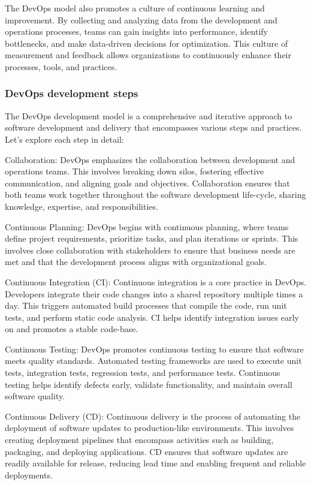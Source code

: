 \documentclass[
12pt,
oneside, 
onehalfspacing, 
nolistspacing, 
parskip, 
chapterinoneline, 
]{AASTCOMPUTER}
\begin{document}
The DevOps model also promotes a culture of continuous learning and improvement. By collecting and analyzing data from the development and operations processes, teams can gain insights into performance, identify bottlenecks, and make data-driven decisions for optimization. This culture of measurement and feedback allows organizations to continuously enhance their processes, tools, and practices.

\subsubsection{DevOps development steps}

The DevOps development model is a comprehensive and iterative approach to software development and delivery that encompasses various steps and practices. Let's explore each step in detail:

Collaboration: DevOps emphasizes the collaboration between development and operations teams. This involves breaking down silos, fostering effective communication, and aligning goals and objectives. Collaboration ensures that both teams work together throughout the software development life-cycle, sharing knowledge, expertise, and responsibilities.

Continuous Planning: DevOps begins with continuous planning, where teams define project requirements, prioritize tasks, and plan iterations or sprints. This involves close collaboration with stakeholders to ensure that business needs are met and that the development process aligns with organizational goals.

Continuous Integration (CI): Continuous integration is a core practice in DevOps. Developers integrate their code changes into a shared repository multiple times a day. This triggers automated build processes that compile the code, run unit tests, and perform static code analysis. CI helps identify integration issues early on and promotes a stable code-base.

Continuous Testing: DevOps promotes continuous testing to ensure that software meets quality standards. Automated testing frameworks are used to execute unit tests, integration tests, regression tests, and performance tests. Continuous testing helps identify defects early, validate functionality, and maintain overall software quality.

Continuous Delivery (CD): Continuous delivery is the process of automating the deployment of software updates to production-like environments. This involves creating deployment pipelines that encompass activities such as building, packaging, and deploying applications. CD ensures that software updates are readily available for release, reducing lead time and enabling frequent and reliable deployments.
\end{document}
